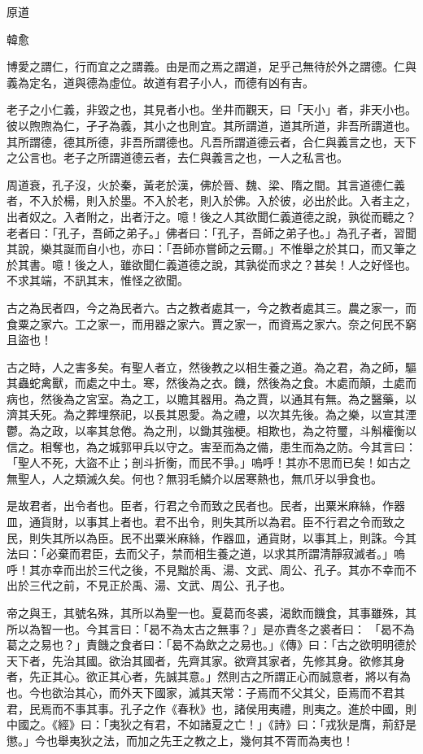 原道

韓愈

博愛之謂仁，行而宜之之謂義。由是而之焉之謂道，足乎己無待於外之謂德。仁與義為定名，道與德為虛位。故道有君子小人，而德有凶有吉。

老子之小仁義，非毀之也，其見者小也。坐井而觀天，曰「天小」者，非天小也。彼以煦煦為仁，孑孑為義，其小之也則宜。其所謂道，道其所道，非吾所謂道也。其所謂德，德其所德，非吾所謂德也。凡吾所謂道德云者，合仁與義言之也，天下之公言也。老子之所謂道德云者，去仁與義言之也，一人之私言也。

周道衰，孔子沒，火於秦，黃老於漢，佛於晉、魏、梁、隋之間。其言道德仁義者，不入於楊，則入於墨。不入於老，則入於佛。入於彼，必出於此。入者主之，出者奴之。入者附之，出者汙之。噫！後之人其欲聞仁義道德之說，孰從而聽之？老者曰：「孔子，吾師之弟子。」佛者曰：「孔子，吾師之弟子也。」為孔子者，習聞其說，樂其誕而自小也，亦曰：「吾師亦嘗師之云爾。」不惟舉之於其口，而又筆之於其書。噫！後之人，雖欲聞仁義道德之說，其孰從而求之？甚矣！人之好怪也。不求其端，不訊其末，惟怪之欲聞。

古之為民者四，今之為民者六。古之教者處其一，今之教者處其三。農之家一，而食粟之家六。工之家一，而用器之家六。賈之家一，而資焉之家六。奈之何民不窮且盜也！

古之時，人之害多矣。有聖人者立，然後教之以相生養之道。為之君，為之師，驅其蟲蛇禽獸，而處之中土。寒，然後為之衣。饑，然後為之食。木處而顛，土處而病也，然後為之宮室。為之工，以贍其器用。為之賈，以通其有無。為之醫藥，以濟其夭死。為之葬埋祭祀，以長其恩愛。為之禮，以次其先後。為之樂，以宣其湮鬱。為之政，以率其怠倦。為之刑，以鋤其強梗。相欺也，為之符璽，斗斛權衡以信之。相奪也，為之城郭甲兵以守之。害至而為之備，患生而為之防。今其言曰：「聖人不死，大盜不止；剖斗折衡，而民不爭。」嗚呼！其亦不思而已矣！如古之無聖人，人之類滅久矣。何也？無羽毛鱗介以居寒熱也，無爪牙以爭食也。

是故君者，出令者也。臣者，行君之令而致之民者也。民者，出粟米麻絲，作器皿，通貨財，以事其上者也。君不出令，則失其所以為君。臣不行君之令而致之民，則失其所以為臣。民不出粟米麻絲，作器皿，通貨財，以事其上，則誅。今其法曰：「必棄而君臣，去而父子，禁而相生養之道，以求其所謂清靜寂滅者。」嗚呼！其亦幸而出於三代之後，不見黜於禹、湯、文武、周公、孔子。其亦不幸而不出於三代之前，不見正於禹、湯、文武、周公、孔子也。

帝之與王，其號名殊，其所以為聖一也。夏葛而冬裘，渴飲而饑食，其事雖殊，其所以為智一也。今其言曰：「曷不為太古之無事？」是亦責冬之裘者曰： 「曷不為葛之之易也？」責饑之食者曰：「曷不為飲之之易也。」《傳》曰：「古之欲明明德於天下者，先治其國。欲治其國者，先齊其家。欲齊其家者，先修其身。欲修其身者，先正其心。欲正其心者，先誠其意。」然則古之所謂正心而誠意者，將以有為也。今也欲治其心，而外天下國家，滅其天常：子焉而不父其父，臣焉而不君其君，民焉而不事其事。孔子之作《春秋》也，諸侯用夷禮，則夷之。進於中國，則中國之。《經》曰：「夷狄之有君，不如諸夏之亡！」《詩》曰：「戎狄是膺，荊舒是懲。」今也舉夷狄之法，而加之先王之教之上，幾何其不胥而為夷也！

